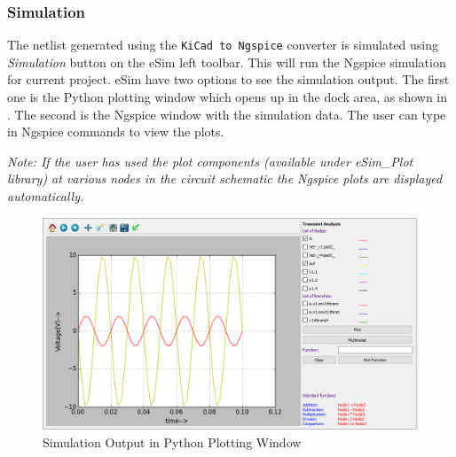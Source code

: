 \subsubsection {Simulation}
The netlist generated using the \texttt{KiCad to Ngspice} converter 
is simulated using \textit{Simulation} button on the eSim left toolbar. This
will run the Ngspice simulation for current project. eSim have two options 
to see the simulation output. The first one is the Python plotting window 
which opens up in the dock area, as shown in . 
The second is the Ngspice window with the simulation data. The user can 
type in Ngspice commands to view the plots. 

\textit {Note: If the user has used the plot components (available under eSim\_Plot library) at various nodes in the circuit schematic the Ngspice plots are displayed automatically.}

\begin{figure}[h]
\centering
\includegraphics[width=\hgfig]{manual_images/simulation-op.png}
\caption{Simulation Output in Python Plotting Window}
\label{simulation-op}
\end{figure}




